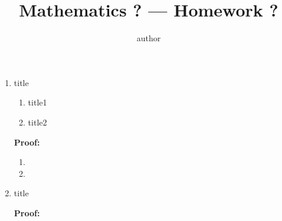 \documentclass[12pt]{article}
\title{Mathematics ?  — Homework ?}
\author{author}
\date{}
\newcommand{\proof}{\par \textbf{Proof:}\par }
\begin{document}
	\maketitle
 
\begin{enumerate}
\item title
	\begin{enumerate}
	\item title1 
	\item title2
	\end{enumerate}
	\proof 
	\begin{enumerate}
	\item 
	\item  
	\end{enumerate}

\item title
	\proof

	
\end{enumerate}
\end{document}
